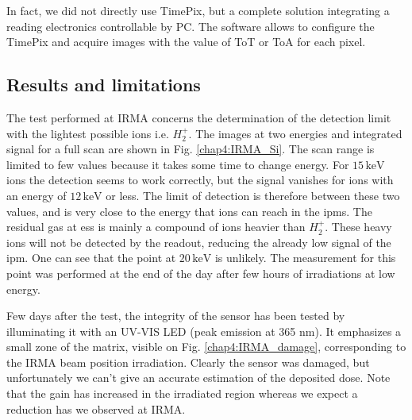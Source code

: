 \begin{refsection}
  In fact, we did not directly use TimePix, but a complete solution \cite{Kraus2011,advacam2019} integrating a reading electronics controllable by PC. The software allows to configure the TimePix and acquire images with the value of ToT or ToA for each pixel.

  \subsection{Results and limitations}

  The test performed at IRMA concerns the determination of the detection limit with the lightest possible ions i.e. $H_{2}^{+}$. The images at two energies and integrated signal for a full scan are shown in Fig. \ref{chap4:IRMA_Si}. The scan range is limited to few values because it takes some time to change energy. For $15\,\mathrm{keV}$ ions the detection seems to work correctly, but the signal vanishes for ions with an energy of $12\,\mathrm{keV}$ or less. The limit of detection is therefore between these two values, and is very close to the energy that ions can reach in the \acrshort{ipm}s. The residual gas at \acrshort{ess} is mainly a compound of ions heavier than $H_{2}^{+}$. These heavy ions will not be detected by the readout, reducing the already low signal of the \acrshort{ipm}. One can see that the point at $20\,\mathrm{keV}$ is unlikely. The measurement for this point was performed at the end of the day after few hours of irradiations at low energy.

  

  
  Few days after the test, the integrity of the sensor has been tested by illuminating it with an UV-VIS LED (peak emission at 365 nm). It emphasizes a small zone of the matrix, visible on Fig. \ref{chap4:IRMA_damage}, corresponding to the IRMA beam position irradiation. Clearly the sensor was damaged, but unfortunately we can't give an accurate estimation of the deposited dose. Note that the gain has increased in the irradiated region whereas we expect a reduction has we observed at IRMA.


\end{refsection}
